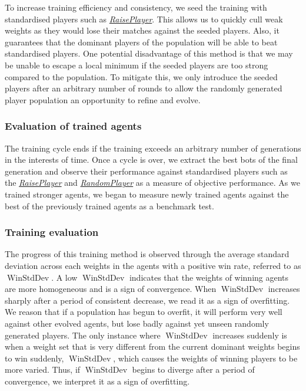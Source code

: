 \documentclass{article}
\begin{document}
To increase training efficiency and consistency, we seed the training with standardised players such as \hyperlink{raiseplayer}{\emph{RaisePlayer}}. This allows us to quickly cull weak weights as they would lose their matches against the seeded players. Also, it guarantees that the dominant players of the population will be able to beat standardised players. One potential disadvantage of this method is that we may be unable to escape a local minimum if the seeded players are too strong compared to the population. To mitigate this, we only introduce the seeded players after an arbitrary number of rounds to allow the randomly generated player population an opportunity to refine and evolve.

\subsubsection{Evaluation of trained agents}
The training cycle ends if the training exceeds an arbitrary number of generations in the interests of time. Once a cycle is over, we extract the best bots of the final generation and observe their performance against standardised players such as the \hyperlink{raiseplayer}{\emph{RaisePlayer}} and \hyperlink{randomplayer}{\emph{RandomPlayer}} as a measure of objective performance. As we trained stronger agents, we began to measure newly trained agents against the best of the previously trained agents as a benchmark test.

\subsubsection{Training evaluation}
The progress of this training method is observed through the average standard deviation across each weights in the agents with a positive win rate, referred to as \(\operatorname{WinStdDev}\). A low \(\operatorname{WinStdDev}\) indicates that the weights of winning agents are more homogeneous and is a sign of convergence. When \(\operatorname{WinStdDev}\) increases sharply after a period of consistent decrease, we read it as a sign of overfitting. We reason that if a population has begun to overfit, it will perform very well against other evolved agents, but lose badly against yet unseen randomly generated players. The only instance where \(\operatorname{WinStdDev}\) increases suddenly is when a weight set that is very different from the current dominant weights begins to win suddenly, \(\operatorname{WinStdDev}\), which causes the weights of winning players to be more varied. Thus, if \(\operatorname{WinStdDev}\) begins to diverge after a period of convergence, we interpret it as a sign of overfitting.
\end{document}

